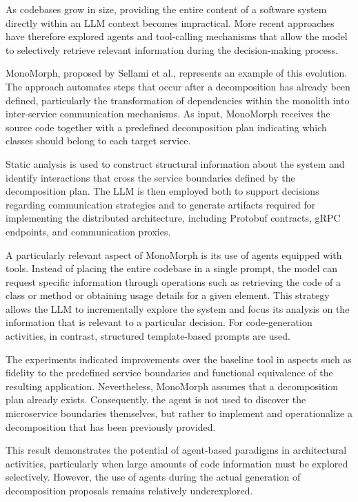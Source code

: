 \documentclass[acmsmall,screen,anonymous,review]{acmart}
\begin{document}
As codebases grow in size, providing the entire content of a software system directly within an LLM context becomes impractical. More recent approaches have therefore explored agents and tool-calling mechanisms that allow the model to selectively retrieve relevant information during the decision-making process.

MonoMorph, proposed by Sellami et al., represents an example of this evolution. The approach automates steps that occur after a decomposition has already been defined, particularly the transformation of dependencies within the monolith into inter-service communication mechanisms. As input, MonoMorph receives the source code together with a predefined decomposition plan indicating which classes should belong to each target service.

Static analysis is used to construct structural information about the system and identify interactions that cross the service boundaries defined by the decomposition plan. The LLM is then employed both to support decisions regarding communication strategies and to generate artifacts required for implementing the distributed architecture, including Protobuf contracts, gRPC endpoints, and communication proxies.

A particularly relevant aspect of MonoMorph is its use of agents equipped with tools. Instead of placing the entire codebase in a single prompt, the model can request specific information through operations such as retrieving the code of a class or method or obtaining usage details for a given element. This strategy allows the LLM to incrementally explore the system and focus its analysis on the information that is relevant to a particular decision. For code-generation activities, in contrast, structured template-based prompts are used.

The experiments indicated improvements over the baseline tool in aspects such as fidelity to the predefined service boundaries and functional equivalence of the resulting application. Nevertheless, MonoMorph assumes that a decomposition plan already exists. Consequently, the agent is not used to discover the microservice boundaries themselves, but rather to implement and operationalize a decomposition that has been previously provided.

This result demonstrates the potential of agent-based paradigms in architectural activities, particularly when large amounts of code information must be explored selectively. However, the use of agents during the actual generation of decomposition proposals remains relatively underexplored.
\end{document}
